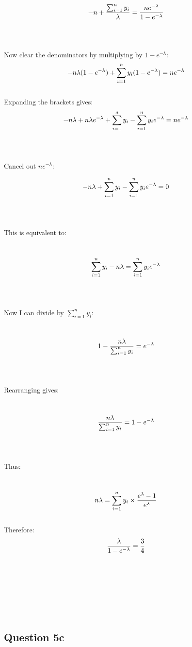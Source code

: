 \documentclass[
]{article}
\begin{document}
\[
\Large
-n + \frac{\sum_{i=1}^n y_i}{\lambda}= \frac{ne^{-\lambda}}{1-e^{-\lambda}} 
\]\\
\strut \\
Now clear the denominators by multiplying by \({1-e^{-\lambda}}\):\\

\[
\Large
-n\lambda(1-e^{-\lambda})  + \sum_{i=1}^n y_i(1-e^{-\lambda}) = ne^{-\lambda}
\]\\

Expanding the brackets gives: \[
\Large
-n\lambda + n\lambda e^{-\lambda} + \sum_{i=1}^n y_i -\sum_{i=1}^ny_ie^{-\lambda} = ne^{-\lambda}
\]\\
\strut \\
Cancel out \(ne^{-\lambda}\):

\[
\Large
-n\lambda + \sum_{i=1}^n y_i -\sum_{i=1}^ny_ie^{-\lambda} = 0
\]\\
\strut \\
This is equivalent to:\\
\strut \\
\[
\Large
\sum_{i=1}^n y_i -n\lambda  = \sum_{i=1}^ny_ie^{-\lambda}
\]\\
\strut \\

Now I can divide by \(\sum_{i=1}^n y_i\):\\
\strut \\
\[
\Large
1-\frac{n\lambda}{ \sum_{i=1}^n y_i }  =  e^{-\lambda}
\]\\
\strut \\
Rearranging gives:\\
\strut \\

\[
\Large
\frac{n\lambda}{ \sum_{i=1}^n y_i }  =  1- e^{-\lambda}
\]\\
\strut \\
Thus:\\
\strut \\
\[
\Large
n\lambda  =  \sum_{i=1}^n y_i  \times \frac{e^\lambda-1}{e^\lambda}
\]\\

Therefore:\\
\[
\Large
\frac{\lambda}{1 - e^{-\lambda}} = \frac{3}{4}
\]\\
\strut \\
\strut \\
\strut \\

\subsection{Question 5c}\label{question-5c}
\end{document}

